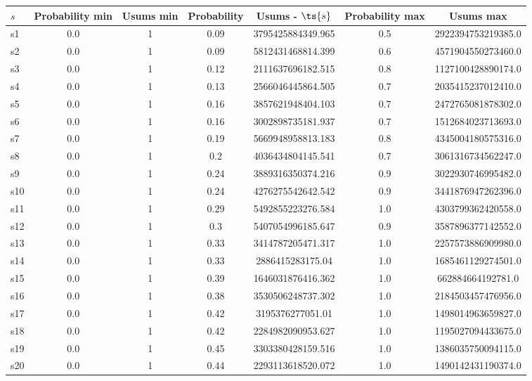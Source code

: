\documentclass{article}
\begin{document}
\noindent\begin{tabular}{|l|c|c|c|c|c|c|}
\hline
$s$& Probability min & Usums min & Probability & Usums - $\ts{s}$ & Probability max & Usums max\\
\hline
s1 &0.0 & 1 & 0.09 & 3795425884349.965 & 0.5 & 2922394753219385.0\\
\hline
s2 &0.0 & 1 & 0.09 & 5812431468814.399 & 0.6 & 4571904550273460.0\\
\hline
s3 &0.0 & 1 & 0.12 & 2111637696182.515 & 0.8 & 1127100428890174.0\\
\hline
s4 &0.0 & 1 & 0.13 & 2566046445864.505 & 0.7 & 2035415237012410.0\\
\hline
s5 &0.0 & 1 & 0.16 & 3857621948404.103 & 0.7 & 2472765081878302.0\\
\hline
s6 &0.0 & 1 & 0.16 & 3002898735181.937 & 0.7 & 1512684023713693.0\\
\hline
s7 &0.0 & 1 & 0.19 & 5669948958813.183 & 0.8 & 4345004180575316.0\\
\hline
s8 &0.0 & 1 & 0.2 & 4036434804145.541 & 0.7 & 3061316734562247.0\\
\hline
s9 &0.0 & 1 & 0.24 & 3889316350374.216 & 0.9 & 3022930746995482.0\\
\hline
s10 &0.0 & 1 & 0.24 & 4276275542642.542 & 0.9 & 3441876947262396.0\\
\hline
s11 &0.0 & 1 & 0.29 & 5492855223276.584 & 1.0 & 4303799362420558.0\\
\hline
s12 &0.0 & 1 & 0.3 & 5407054996185.647 & 0.9 & 3587896377142552.0\\
\hline
s13 &0.0 & 1 & 0.33 & 3414787205471.317 & 1.0 & 2257573886909980.0\\
\hline
s14 &0.0 & 1 & 0.33 & 2886415283175.04 & 1.0 & 1685461129274501.0\\
\hline
s15 &0.0 & 1 & 0.39 & 1646031876416.362 & 1.0 & 662884664192781.0\\
\hline
s16 &0.0 & 1 & 0.38 & 3530506248737.302 & 1.0 & 2184503457476956.0\\
\hline
s17 &0.0 & 1 & 0.42 & 3195376277051.01 & 1.0 & 1498014963659827.0\\
\hline
s18 &0.0 & 1 & 0.42 & 2284982090953.627 & 1.0 & 1195027094433675.0\\
\hline
s19 &0.0 & 1 & 0.45 & 3303380428159.516 & 1.0 & 1386035750094115.0\\
\hline
s20 &0.0 & 1 & 0.44 & 2293113618520.072 & 1.0 & 1490142431190374.0\\
\hline
\end{tabular}\\
\end{document}

